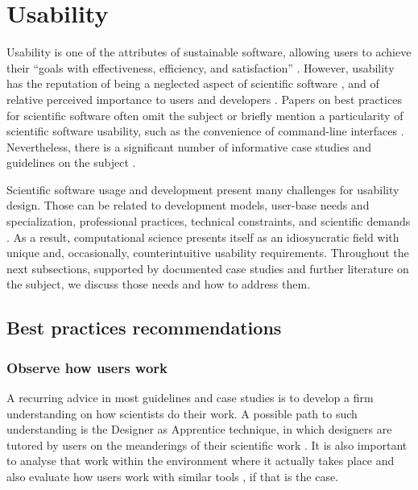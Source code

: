 \section{Usability}
\label{sec:usability}

Usability is one of the attributes of sustainable software, allowing users to achieve their “goals with effectiveness, efficiency, and satisfaction” \cite[p.3]{Venters_WSSSPE}. However, usability has the reputation of being a neglected aspect of scientific software \cite{Ahmed:2014}, and of relative perceived importance to users and developers \cite{Nguyen-Hoan:2010, Hucka:2016}. Papers on best practices for scientific software often omit the subject \cite{Stodden_WSSSPE, Wilson:2016} or briefly mention a particularity of scientific software usability, such as the convenience of command-line interfaces \cite{bestprSC}. Nevertheless, there is a significant number of informative case studies and guidelines on the subject \cite{Springmeyer:1993, Pancake:1996, Javahery:2004, Schraefel:2004,Letondal:2004, Talbott:2005, Macaulay:2009, DeRoure:2009, Keefe:2010, DeMatos:2013, Ahmed:2014}.

Scientific software usage and development present many challenges for usability design. Those can be related to development models, user-base needs and specialization, professional practices, technical constraints, and scientific demands \cite{Queiroz:2016}. As a result, computational science presents itself as an idiosyncratic field with unique and, occasionally, counterintuitive usability requirements. Throughout the next subsections, supported by documented case studies and further literature on the subject, we discuss those needs and how to address them. 

\subsection{Best practices recommendations}

\subsubsection{Observe how users work}

A recurring advice in most guidelines and case studies is to develop a firm understanding on how scientists do their work. A possible path to such understanding is the Designer as Apprentice technique, in which designers are tutored by users on the meanderings of their scientific work \cite{Springmeyer:1993}.  It is also important to analyse that work within the environment where it actually takes place \cite{Pancake:1996} and also evaluate how users work with similar tools  \cite{Javahery:2004}, if that is the case. 

